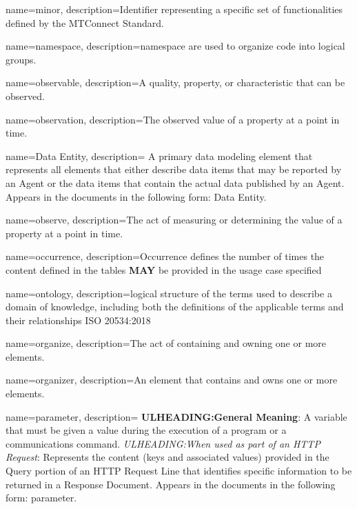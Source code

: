 {
    name={minor},
	description={Identifier representing a specific set of functionalities defined by the MTConnect Standard.}
}

{
    name={namespace},
	description={\gls{namespace} are used to organize code into logical groups.}
}

{
    name={observable},
	description={A quality, property, or characteristic that can be observed.}
}

{
    name={observation},
	description={The observed value of a property at a point in time.}
}

{
    name={Data Entity},
	description={
	A primary data modeling element that represents all elements that either describe data items that may be reported by an \gls{Agent} or the data items that contain the actual data published by an \gls{Agent}.
	Appears in the documents in the following form: \gls{Data Entity}.
}
}

{
    name={observe},
	description={The act of measuring or determining the value of a property at a point in time.}
}

{
    name={occurrence},
	description={Occurrence defines the number of times the content defined in the tables \textbf{MAY} be provided in the usage case specified}
}

{
    name={ontology},
	description={logical structure of the terms used to describe a domain of knowledge, including both the definitions of the applicable terms and their relationships ISO 20534:2018}
}

{
    name={organize},
	description={The act of containing and owning one or more elements.}
}

{
    name={organizer},
	description={An element that contains and owns one or more elements.}
}

{
    name={parameter},
	description={
	\textbf{ULHEADING:General Meaning}:
	A variable that must be given a value during the execution of a program or a communications command.
	\textit{ULHEADING:When used as part of an \gls{HTTP Request}}:
	Represents the content (keys and associated values) provided in the \gls{Query} portion of an \gls{HTTP Request Line} that identifies specific information to be returned in a \gls{Response Document}.
	Appears in the documents in the following form: parameter.
}
}

